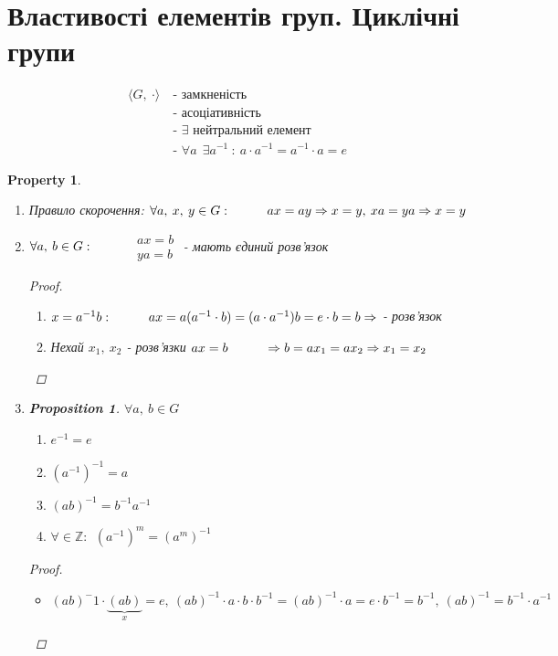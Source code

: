 \documentclass[a4paper,12pt, centered]{bookest}
\newtheorem*{property*}{Property}
\newtheorem*{prop*}{Proposition}
\newcommand\tab[1][1cm]{\hspace*{#1}}
\begin{document}
\section{Властивості елементів груп. Циклічні групи}
\begin{align*}
	\langle G,\>\cdot \rangle\> & \textrm{- замкненість}\\
	& \textrm{- асоціативність} \\
	& \textrm{- }\exists\textrm{ нейтральний елемент}\\
	& \textrm{- } \forall a\>\>\exists a^{-1}\>:\>a\cdot  a^{-1}=a^{-1}\cdot  a=e
\end{align*}
\begin{property*}$ $
	\begin{enumerate}
		\item Правило скорочення: $\\\forall a,\>x,\>y\in G:\tab ax=ay\Rightarrow x=y,\>xa=ya\Rightarrow x=y$
		\item $\forall a,\>b\in G:\tab$ $\begin{array}{c}
			ax=b\\ya=b
		\end{array}$ - мають єдиний розв'язок \begin{proof}$ $
			\begin{enumerate}\item $x=a^{-1}b:\tab ax=a(a^{-1}\cdot  b)=(a\cdot  a^{-1})b=e\cdot  b=b\Rightarrow$ - розв'язок
			\item Нехай $x_1,\>x_2$ - розв'язки $ax=b\tab \Rightarrow b=ax_1=ax_2\Rightarrow x_1=x_2$
			  \end{enumerate}
		\end{proof}
		\item \begin{prop*}$\forall a,\>b\in G$
			\begin{enumerate} 
				\item $e^{-1}=e$
				\item $(a^{-1})^{-1}=a$
				\item $(ab)^{-1}=b^{-1}a^{-1}$
				\item $\forall\in\mathbb{Z}:\>\>(a^{-1})^m=(a^m)^{-1}$
			\end{enumerate}
			\begin{proof}$ $
				\begin{itemize}
					\item [(c)] $(ab)^-1\cdot \underbrace{(ab)}_{x}=e,\>(ab)^{-1}\cdot  a\cdot  b\cdot  b^{-1}=(ab)^{-1}\cdot  a=e\cdot  b^{-1}=b^{-1},\>(ab)^{-1}=b^{-1}\cdot  a^{-1}$

\end{itemize}
\end{proof}
\end{prop*}
\end{enumerate}
\end{property*}
\end{document}

